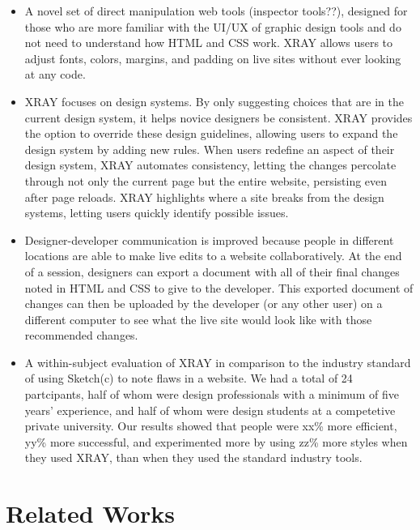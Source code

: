 \documentclass{sigchi}
\newcommand{\xray}{XRAY\xspace}
\begin{document}
\begin{itemize}
    \item A novel set of direct manipulation web tools (inspector tools??), designed for those who are more familiar with the UI/UX of graphic design tools and do not need to understand how HTML and CSS work. \xray allows users to adjust fonts, colors, margins, and padding on live sites without ever looking at any code. 
    
    \item \xray focuses on design systems. By only suggesting choices that are in the current design system, it helps novice designers be consistent. \xray provides the option to override these design guidelines, allowing users to expand the design system by adding new rules. When users redefine an aspect of their design system, \xray automates consistency, letting the changes percolate through not only the current page but the entire website, persisting even after page reloads. \xray highlights where a site breaks from the design systems, letting users quickly identify possible issues. 
    
    \item Designer-developer communication is improved because people in different locations are able to make live edits to a website collaboratively. At the end of a session, designers can export a document with all of their final changes noted in HTML and CSS to give to the developer. This exported document of changes can then be uploaded by the developer (or any other user) on a different computer to see what the live site would look like with those recommended changes. 
    
    \item A within-subject evaluation of \xray in comparison to the industry standard of using Sketch(c) to note flaws in a website. We had a total of 24 partcipants, half of whom were design professionals with a minimum of five years' experience, and half of whom were design students at a competetive private university. Our results showed that people were xx\% more efficient, yy\% more successful, and experimented more by using zz\% more styles when they used \xray, than when they used the standard industry tools.
\end{itemize}


\section{Related Works}
\end{document}
